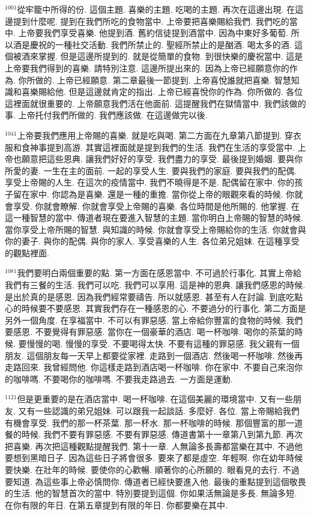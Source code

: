 \documentclass{book}
\begin{document}
$^{1001}$從牢籠中所得的份.
這個主題.
喜樂的主題.
吃喝的主題.
再次在這邊出現.
在這邊提到什麼呢.
提到在我們所吃的食物當中.
上帝要把喜樂賜給我們.
我們吃的當中.
上帝要我們享受喜樂.
他提到酒.
舊約信徒提到酒當中.
因為中東好多葡萄.
所以酒是慶祝的一種社交活動.
我們所禁止的.
聖經所禁止的是酗酒.
喝太多的酒.
這個被酒來掌握.
但是這邊所提到的.
就是從簡單的食物.
到很快樂的慶祝當中.
這是上帝要我們得到的喜樂.
請特別注意.
這邊所提出來的.
因為上帝已經願意你的作為.
你所做的.
上帝已經願意.
第二章最後一節提到.
上帝喜悅誰就把喜樂.
智慧知識和喜樂賜給他.
但是這邊就肯定的指出.
上帝已經喜悅你的作為.
你所做的.
各位這裡面就很重要的.
上帝願意我們活在他面前.
這提醒我們在獄情當中.
我們該做的事.
上帝托付我們所做的.
我們應該做.
在這邊做完以後.

$^{1041}$上帝要我們應用上帝賜的喜樂.
就是吃與喝.
第二方面在九章第八節提到.
穿衣服和食神事提到高游.
其實這裡面就是提到我們的生活.
我們在生活的享受當中.
上帝也願意把這些恩典.
讓我們好好的享受.
我們盡力的享受.
最後提到婚姻.
要與你所愛的妻.
一生在主的面前.
一起的享受人生.
要與我們的家庭.
要與我們的配偶.
享受上帝賜的人生.
在這次的疫情當中.
我們不曉得是不是.
配偶留在家中.
你的孩子留在家中.
你認為是喜樂.
還是一種的重擔.
當你從上帝的眼觀來看的時候.
你就會享受.
你就會瞭解.
你就會享受上帝賜的喜樂.
各位時間是他所賜的.
他掌握.
在這一種智慧的當中.
傳道者現在要進入智慧的主題.
當你明白上帝賜的智慧的時候.
當你享受上帝所賜的智慧.
與知識的時候.
你就會享受上帝賜給你的生活.
你就會與你的妻子.
與你的配偶.
與你的家人.
享受喜樂的人生.
各位弟兄姐妹.
在這種享受的觀點裡面.

$^{1081}$我們要明白兩個重要的點.
第一方面在感恩當中.
不可過於行事化.
其實上帝給我們有三餐的生活.
我們可以吃.
我們可以享用.
這是神的恩典.
讓我們感恩的時候.
是出於真的是感恩.
因為我們經常要禱告.
所以就感恩.
甚至有人在討論.
到底吃點心的時候要不要感恩.
其實我們存在一種感恩的心.
不要過分的行事化.
第二方面是另外一個角度.
在享福當中.
不可以有罪惡感.
當上帝給你豐富的食物的時候.
我們要感恩.
不要覺得有罪惡感.
當你在一個豪華的酒店.
喝一杯咖啡.
喝你的茶葉的時候.
要慢慢的喝.
慢慢的享受.
不要喝得太快.
不要有這種的罪惡感.
我父親有一個朋友.
這個朋友每一天早上都要從家裡.
走路到一個酒店.
然後喝一杯咖啡.
然後再走路回來.
我曾經問他.
你這樣走路到酒店喝一杯咖啡.
你在家中.
不要自己來泡你的咖啡嗎.
不要喝你的咖啡嗎.
不要我走路過去.
一方面是運動.

$^{1121}$但是更重要的是在酒店當中.
喝一杯咖啡.
在這個美麗的環境當中.
又有一些朋友.
又有一些認識的弟兄姐妹.
可以跟我一起談話.
多麼好.
各位.
當上帝賜給我們有機會享受.
我們的那一杯茶葉.
那一杯水.
那一杯咖啡的時候.
那個豐富的那一道餐的時候.
我們不要有罪惡感.
不要有罪惡感.
傳道書第十一章第八到第九節.
再次把喜樂.
再次把這種觀點提醒我們.
第十一章.
人無論多長壽都當樂在其中.
不過他要想到黑暗日子.
因為這些日子將會很多.
要來了都是虛空.
年輕啊.
你在幼年時候要快樂.
在壯年的時候.
要使你的心歡暢.
順著你的心所願的.
眼看見的去行.
不過要知道.
為這些事上帝必慎問你.
傳道者已經快要進入他.
最後的重點提到這個敬畏的生活.
他的智慧首次的當中.
特別要提到這個.
你如果活無論是多長.
無論多短.
在你有限的年日.
在第五章提到有限的年日.
你都要樂在其中.
\end{document}
